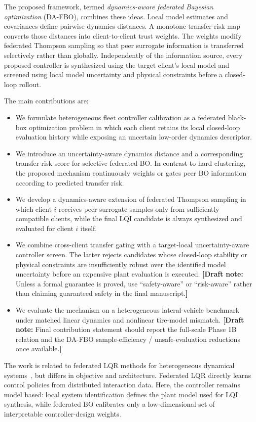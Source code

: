 \documentclass[conference]{IEEEtran}
\newcommand{\draftnote}[1]{\textcolor{blue!70!black}{\textbf{[Draft note:} #1\textbf{]}}}
\newcommand{\method}{DA-FBO}
\begin{document}
The proposed framework, termed \emph{dynamics-aware federated Bayesian optimization} (\method{}), combines these ideas. Local model estimates and covariances define pairwise dynamics distances. A monotone transfer-risk map converts those distances into client-to-client trust weights. The weights modify federated Thompson sampling so that peer surrogate information is transferred selectively rather than globally. Independently of the information source, every proposed controller is synthesized using the target client's local model and screened using local model uncertainty and physical constraints before a closed-loop rollout.

The main contributions are:
\begin{itemize}
\item We formulate heterogeneous fleet controller calibration as a federated black-box optimization problem in which each client retains its local closed-loop evaluation history while exposing an uncertain low-order dynamics descriptor.
\item We introduce an uncertainty-aware dynamics distance and a corresponding transfer-risk score for selective federated BO. In contrast to hard clustering, the proposed mechanism continuously weights or gates peer BO information according to predicted transfer risk.
\item We develop a dynamics-aware extension of federated Thompson sampling in which client $i$ receives peer surrogate samples only from sufficiently compatible clients, while the final LQI candidate is always synthesized and evaluated for client $i$ itself.
\item We combine cross-client transfer gating with a target-local uncertainty-aware controller screen. The latter rejects candidates whose closed-loop stability or physical constraints are insufficiently robust over the identified model uncertainty before an expensive plant evaluation is executed. \draftnote{Unless a formal guarantee is proved, use ``safety-aware'' or ``risk-aware'' rather than claiming guaranteed safety in the final manuscript.}
\item We evaluate the mechanism on a heterogeneous lateral-vehicle benchmark under matched linear dynamics and nonlinear tire-model mismatch. \draftnote{Final contribution statement should report the full-scale Phase 1B relation and the DA-FBO sample-efficiency / unsafe-evaluation reductions once available.}
\end{itemize}

The work is related to federated LQR methods for heterogeneous dynamical systems~\cite{wang2026fedlqr}, but differs in objective and architecture. Federated LQR directly learns control policies from distributed interaction data. Here, the controller remains model based: local system identification defines the plant model used for LQI synthesis, while federated BO calibrates only a low-dimensional set of interpretable controller-design weights.
\end{document}
